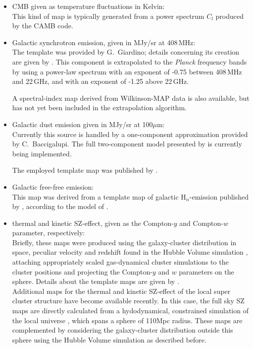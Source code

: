\documentclass{aa}
\begin{document}
\begin{itemize}

  \item CMB given as temperature fluctuations in Kelvin:\\ This kind
    of map is typically generated from a power spectrum $C_l$ produced
    by the CAMB code.

  \item Galactic synchrotron emission, given in MJy/sr at 408\,MHz:\\
    The template was provided by G.~Giardino; details concerning its
    creation are given by \cite{giardino-etal-2002}. This component is
    extrapolated to the \emph{Planck} frequency bands by using a
    power-law spectrum with an exponent of \mbox{-0.75} between
    408\,MHz and 22\,GHz, and with an exponent of \mbox{-1.25} above
    22\,GHz.

    A spectral-index map derived from Wilkinson-MAP data is also
    available, but has not yet been included in the extrapolation
    algorithm.

  \item Galactic dust emission given in MJy/sr at 100$\mu$m:\\
    Currently this source is handled by a one-component approximation
    provided by C.~Baccigalupi. The full two-component model presented
    by \citet{finkbeiner-etal-1999} is currently being implemented.

    The employed template map was published by
    \cite{schlegel-etal-1998}.

  \item Galactic free-free emission: \\ This map was derived from a
    template map of galactic H$_{\alpha}$-emission published by
    \cite{finkbeiner-2003}, according to the model of
    \cite{valls-gabaud-1998}.

  \item thermal and kinetic SZ-effect, given as the Compton-$y$ and
    Compton-$w$ parameter, respectively:\\ Briefly, these maps were
    produced using the galaxy-cluster distribution in space, peculiar
    velocity and redshift found in the Hubble Volume simulation
    \citep{jenkins-etal-2001,colberg-etal-2000},
    attaching appropriately scaled gas-dynamical cluster
    simulations to the cluster positions and projecting the
    Compton-$y$ and $w$ parameters on the sphere. Details about the
    template maps are given by \cite{schaefer-etal-2004a}.\\
    Additional maps for the thermal and kinetic SZ-effect of the local super
    cluster structure have become available recently. In this case,
    the full sky SZ maps are directly calculated from a hydodynamical,
    constrained simulation of the local universe \citep{dolag-etal-2005},
    which spans a sphere of 110Mpc radius. These maps are complemented by
    considering the galaxy-cluster distribution outside this sphere using the
    Hubble Volume simulation as described before.


\end{itemize}
\end{document}
